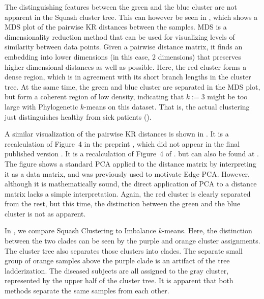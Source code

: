 The distinguishing features between the green and the blue cluster are not apparent in the Squash cluster tree.
This can however be seen in ,
which shows a \acf{MDS} plot of the pairwise KR distances between the samples.
\ac{MDS} \cite{Mardia1978,Krzanowski1994,Everitt2010} is a dimensionality reduction method that
can be used for visualizing levels of similarity between data points.
Given a pairwise distance matrix, it finds an embedding into lower dimensions (in this case, \num{2} dimensions)
that preserves higher dimensional distances as well as possible.
Here, the red cluster forms a dense region, which is in agreement with its short branch lengths
in the cluster tree.
At the same time, the green and blue cluster are separated in the \ac{MDS} plot,
but form a coherent region of low density,
indicating that $k:=3$ might be too large with Phylogenetic $k$-means on this dataset.
That is, the actual clustering just distinguishes healthy from sick patients ().

A similar visualization of the pairwise KR distances is shown in .
It is a recalculation of Figure~4 in the preprint \cite{Matsen2011b},
which did not appear in the final published version \cite{Matsen2011a}.
It is a recalculation of Figure~4 of \cite{Matsen2011b}.
but can also be found at \cite{MatsenEdgePCA}.
The figure shows a standard \acf{PCA} \cite{Krzanowski1994,Everitt2010} applied to the distance matrix
by interpreting it as a data matrix, and was previously used to motivate Edge PCA.
However, although it is mathematically sound,
the direct application of \ac{PCA} to a distance matrix lacks a simple interpretation.
Again, the red cluster is clearly separated from the rest,
but this time, the distinction between the green and the blue cluster is not as apparent.

In , we compare Squash Clustering to Imbalance $k$-means.
Here, the distinction between the two  clades
can be seen by the purple and orange cluster assignments.
The cluster tree also separates those clusters into clades.
The separate small group of orange samples above the purple clade is an artifact of the tree ladderization.
The diseased subjects are all assigned to the gray cluster, represented by the upper half of the cluster tree.
It is apparent that both methods separate the same samples from each other.

